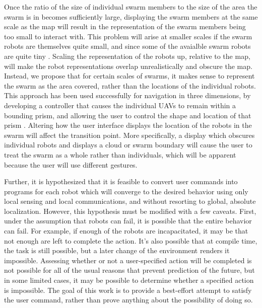 \documentclass[]{article}
\begin{document}
Once the ratio of the size of individual swarm members to the size of the area the swarm is in becomes sufficiently large, displaying the swarm members at the same scale as the map will result in the representation of the swarm members being too small to interact with. 
This problem will arise at smaller scales if the swarm robots are themselves quite small, and since some of the avaialble swarm robots are quite tiny \cite{pelrine2012diamagnetically}.
Scaling the representation of the robots up, relative to the map, will make the robot representations overlap unrealistically and obscure the map. 
Instead, we propose that for certain scales of swarms, it makes sense to represent the swarm as the area covered, rather than the locations of the individual robots.
This approach has been used successfully for navigation in three dimensions, by developing a controller that causes the individual UAVs to remain within a bounding prism, and allowing the user to control the shape and location of that prism \cite{ayanian2014controlling}.
Altering how the user interface displays the location of the robots in the swarm will affect the transition point. 
More specifically, a display which obscures individual robots and displays a cloud or swarm boundary will cause the user to treat the swarm as a whole rather than individuals, which will be apparent because the user will use different gestures. 

Further, it is hypothesized that it is feasible to convert user commands into programs for each robot which will converge to the desired behavior using only local sensing and local communications, and without resorting to global, absolute localization. 
However, this hypothesis must be modified with a few caveats. 
First, under the assumption that robots can fail, it is possible that the entire behavior can fail. 
For example, if enough of the robots are incapacitated, it may be that not enough are left to complete the action. 
It's also possible that at compile time, the task is still possible, but a later change of the environment renders it impossible. 
Assessing whether or not a user-specified action will be completed is not possible for all of the usual reasons that prevent prediction of the future, but in some limited cases, it may be possible to determine whether a specified action is impossible. The goal of this work is to provide a best-effort attempt to satisfy the user command, rather than prove anything about the possibility of doing so. 

\end{document}
